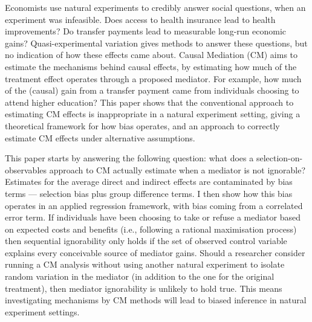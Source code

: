 Economists use natural experiments to credibly answer social questions, when an experiment was infeasible.
Does access to health insurance lead to health improvements?
Do transfer payments  lead to measurable long-run economic gains?
Quasi-experimental variation gives methods to answer these questions, but no indication of how these effects came about.
Causal Mediation (CM) aims to estimate the mechanisms behind causal effects, by estimating how much of the treatment effect operates through a proposed mediator.
For example, how much of the (causal) gain from a transfer payment came from individuals choosing to attend higher education?
This paper shows that the conventional approach to estimating CM effects is inappropriate in a natural experiment setting, giving a theoretical framework for how bias operates, and an approach to correctly estimate CM effects under alternative assumptions.

This paper starts by answering the following question: what does a selection-on-observables approach to CM actually estimate when a mediator is not ignorable?
Estimates for the average direct and indirect effects are contaminated by bias terms --- selection bias plus group difference terms.
I then show how this bias operates in an applied regression framework, with bias coming from a correlated error term.
If individuals have been choosing to take or refuse a mediator based on expected costs and benefits (i.e., following a rational maximisation process) then sequential ignorability only holds if the set of observed control variable explains every conceivable source of mediator gains.
Should a researcher consider running a CM analysis without using another natural experiment to isolate random variation in the mediator (in addition to the one for the original treatment), then mediator ignorability is unlikely to hold true.
This means investigating mechanisms by CM methods will lead to biased inference in natural experiment settings.

